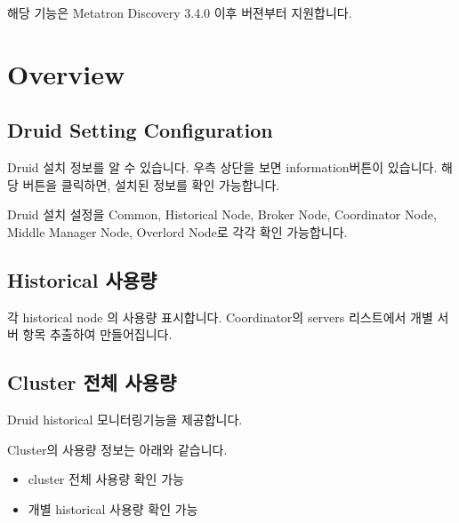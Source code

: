 \documentclass[letterpaper,10pt,english]{sphinxmanual}
\begin{document}
해당 기능은 Metatron Discovery 3.4.0 이후 버젼부터 지원합니다.


\section{Overview}
\label{\detokenize{discovery/part10/overview:overview}}\label{\detokenize{discovery/part10/overview::doc}}

\subsection{Druid Setting Configuration}
\label{\detokenize{discovery/part10/overview:druid-setting-configuration}}
Druid 설치 정보를 알 수 있습니다. 우측 상단을 보면 information버튼이 있습니다. 해당 버튼을 클릭하면, 설치된 정보를 확인 가능합니다.
\begin{quote}

\begin{figure}[H]
\centering

\noindent{}
\end{figure}
\end{quote}

Druid 설치 설정을 Common, Historical Node, Broker Node, Coordinator Node, Middle Manager Node, Overlord Node로 각각 확인 가능합니다.
\begin{quote}

\begin{figure}[H]
\centering

\noindent{}
\end{figure}
\end{quote}


\subsection{Historical 사용량}
\label{\detokenize{discovery/part10/overview:historical}}
각 historical node 의 사용량 표시합니다. Coordinator의 servers 리스트에서 개별 서버 항목 추출하여 만들어집니다.


\subsection{Cluster 전체 사용량}
\label{\detokenize{discovery/part10/overview:cluster}}
Druid historical 모니터링기능을 제공합니다.

Cluster의 사용량 정보는 아래와 같습니다.
\begin{itemize}
\item {} 
cluster 전체 사용량 확인 가능

\item {} 
개별 historical 사용량 확인 가능

\end{itemize}
\end{document}
